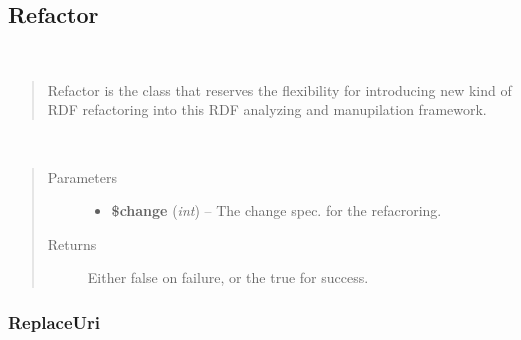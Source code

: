\documentclass[letterpaper,10pt,english]{sphinxmanual}
\begin{document}
\subsection{Refactor}
\label{docs/api:refactor}

\begin{fulllineitems}
\label{docs/api:Refactor}~\begin{quote}

Refactor is the class that reserves
the flexibility for introducing
new kind of RDF refactoring into
this RDF analyzing and manupilation
framework.
\end{quote}

\begin{fulllineitems}
\label{docs/api:Refactor::refactoring}~\begin{quote}\begin{description}
\item[{Parameters}] \leavevmode\begin{itemize}
\item {} 
\textbf{\$change} (\emph{int}) -- The change spec. for the refacroring.

\end{itemize}

\item[{Returns}] \leavevmode
Either false on failure, or the true for success.

\end{description}\end{quote}

\end{fulllineitems}


\end{fulllineitems}



\subsubsection{ReplaceUri}
\label{docs/api:replaceuri}
\end{document}
